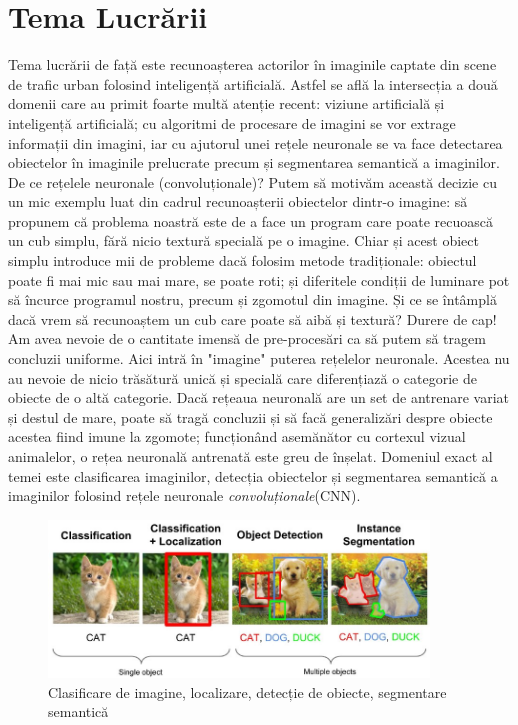 \section {Tema Lucrării}
Tema lucrării de față este recunoașterea actorilor în imaginile captate din scene de trafic urban folosind inteligență artificială. Astfel se află la intersecția a două domenii care au primit foarte multă atenție recent: viziune artificială și inteligență artificială; cu algoritmi de procesare de imagini se vor extrage informații din imagini, iar cu ajutorul unei rețele neuronale se va face detectarea obiectelor în imaginile prelucrate precum și segmentarea semantică a imaginilor.\newline
De ce rețelele neuronale (convoluționale)? Putem să motivăm această decizie cu un mic exemplu luat din cadrul recunoașterii obiectelor dintr-o imagine: să propunem că problema noastră este de a face un program care poate recuoască un cub simplu, fără nicio textură specială pe o imagine. Chiar și acest obiect simplu introduce mii de probleme dacă folosim metode tradiționale: obiectul poate fi mai mic sau mai mare, se poate roti; și diferitele condiții de luminare pot să încurce programul nostru, precum și zgomotul din imagine. Și ce se întâmplă dacă vrem să recunoaștem un cub care poate să aibă și textură? Durere de cap! Am avea nevoie de o cantitate imensă de pre-procesări ca să putem să tragem concluzii uniforme.\newline
Aici intră în "imagine" puterea rețelelor neuronale. Acestea nu au nevoie de nicio trăsătură unică și specială care diferențiază o categorie de obiecte de o altă categorie. Dacă rețeaua neuronală are un set de antrenare variat și destul de mare, poate să tragă concluzii și să facă generalizări despre obiecte acestea fiind imune la zgomote; funcționând asemănător cu cortexul vizual animalelor, o rețea neuronală antrenată este greu de înșelat.\newline
Domeniul exact al temei este clasificarea imaginilor, detecția obiectelor și segmentarea semantică a imaginilor folosind rețele neuronale \textit{convoluționale}(CNN).
\begin{figure}[h!]
    	\centering
	\captionsetup{justification=centering, margin=2cm}
	\includegraphics[width=0.9\textwidth]{figures/class_detect_segment.jpeg}
	\caption{Clasificare de imagine, localizare, detecție de obiecte, segmentare semantică \cite{class_detect_segment}}
	\label{fig:class_detect_semgent}
\end{figure}
